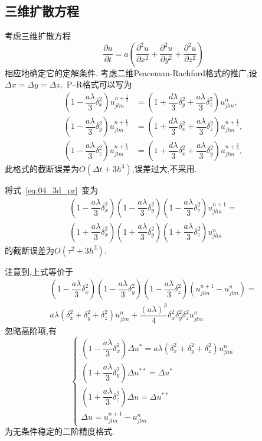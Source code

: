\subsection{三维扩散方程}
考虑三维扩散方程
\begin{equation}
\dfrac{\partial u}{\partial t}=a\left(\dfrac{\partial^2 u}{\partial x^2}+
\dfrac{\partial^2 u}{\partial y^2}+\dfrac{\partial^2 u}{\partial z^2}\right)
\end{equation}
相应地确定它的定解条件.
考虑二维Peaceman-Rachford格式的推广,设$\Delta x=\Delta y=\Delta z$,~P--R格式可以写为
\begin{equation}\label{eq:04_3d_pr}
\begin{split}
\left(1-\dfrac{a\lambda}{3}\delta_x^2\right)u_{jlm}^{n+\frac{1}{3}} &= 
\left(1+\dfrac{d\lambda}{3}\delta_y^2+\dfrac{a\lambda}{3}\delta_z^2\right)u_{jlm}^n, \\
\left(1-\dfrac{a\lambda}{3}\delta_y^2\right)u_{jlm}^{n+\frac{1}{3}} &= 
\left(1+\dfrac{d\lambda}{3}\delta_x^2+\dfrac{a\lambda}{3}\delta_z^2\right)u_{jlm}^{n+\frac{1}{3}}, \\
\left(1-\dfrac{a\lambda}{3}\delta_z^2\right)u_{jlm}^{n+\frac{1}{3}} &= 
\left(1+\dfrac{d\lambda}{3}\delta_x^2+\dfrac{a\lambda}{3}\delta_y^2\right)u_{jlm}^{n+\frac{2}{3}},
\end{split}
\end{equation}
此格式的截断误差为$O(\Delta t+3h^3)$,误差过大,不采用.\par
将式~\ref{eq:04_3d_pr}~变为
\begin{multline}
\left(1-\dfrac{a\lambda}{3}\delta_x^2\right)\left(1-\dfrac{a\lambda}{3}\delta_y^2\right)\left(1-\dfrac{a\lambda}{3}\delta_z^2\right)
u_{jlm}^{n+1}=\\
\left(1+\dfrac{a\lambda}{3}\delta_x^2\right)
\left(1+\dfrac{a\lambda}{3}\delta_y^2\right)
\left(1+\dfrac{a\lambda}{3}\delta_z^2\right)
u_{jlm}^n
\end{multline}
的截断误差为$O(\tau^2+3h^2)$.\par
注意到,上式等价于
\begin{multline}
\left(1-\dfrac{a\lambda}{3}\delta_x^2\right)\left(1-\dfrac{a\lambda}{3}\delta_y^2\right)\left(1-\dfrac{a\lambda}{3}\delta_z^2\right)
(u_{jlm}^{n+1}-u_{jlm}^n)=\\
a\lambda(\delta_x^2+\delta_y^2+\delta_z^2)u_{jlm}^n+\dfrac{(a\lambda)^3}{4}\delta_x^2\delta_y^2\delta_z^2
u_{jlm}^n
\end{multline}
忽略高阶项,有
\begin{equation}
\begin{cases}
\left(1-\dfrac{a\lambda}{3}\delta_x^2\right)\Delta u^*=a\lambda(\delta_x^2+\delta_y^2+\delta_z^2)u_{jlm}^n \\[15pt]
\left(1+\dfrac{a\lambda}{3}\delta_y^2\right)\Delta u^{**} = \Delta u^* \\[15pt]
\left(1+\dfrac{a\lambda}{3}\delta_z^2\right)\Delta u = \Delta u^{**} \\[15pt]
\Delta u = u_{jlm}^{n+1}-u_{jlm}^n
\end{cases}
\end{equation}
为无条件稳定的二阶精度格式.
